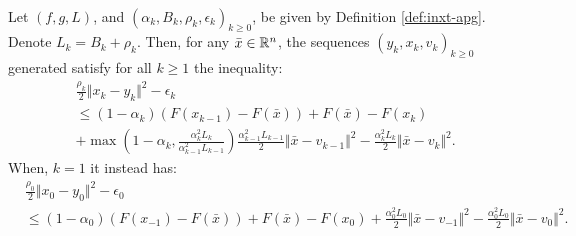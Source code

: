 \documentclass[12pt]{article}
\begin{document}
    \begin{lemma}\; \label{lemma:inxt-apg-cnvg-prep1}\\
        Let $(f, g, L)$, and $(\alpha_k, B_k, \rho_k, \epsilon_k)_{k \ge 0}$, be given by Definition \ref{def:inxt-apg}. 
        Denote $L_k = B_k + \rho_k$. 
        Then, for any $\bar x \in \mathbb R^n$, the sequences $(y_k, x_k, v_k)_{k \ge 0}$ generated satisfy for all $k \ge 1$ the inequality: 
        \begin{align*}
            & \frac{\rho_k}{2}\Vert x_k - y_k\Vert^2 - \epsilon_k
            \\
            &\le 
            (1 - \alpha_k)(F(x_{k - 1}) - F(\bar x)) + F(\bar x) - F(x_k) 
            \\ &
            + \max\left(
                    1 - \alpha_k, \frac{\alpha_k^2L_k}{\alpha_{k - 1}^2L_{k - 1}}
                \right)\frac{\alpha_{k - 1}^2L_{k - 1}}{2}\Vert \bar x - v_{k - 1}\Vert^2 
            - \frac{\alpha_k^2L_k}{2}\Vert \bar x - v_k\Vert^2. 
        \end{align*}
        When, $k = 1$ it instead has: 
        \begin{align*}
            & \frac{\rho_0}{2}\Vert x_0 - y_0\Vert^2 - \epsilon_0 
            \\
            &\le 
            (1 - \alpha_0)(F(x_{-1}) - F(\bar x)) + F(\bar x) - F(x_0) 
            + \frac{\alpha_0^2L_0}{2}\Vert \bar x - v_{-1}\Vert^2
            - \frac{\alpha_0^2L_0}{2}\Vert \bar x - v_0\Vert^2. 
        \end{align*}
    \end{lemma}
\end{document}
